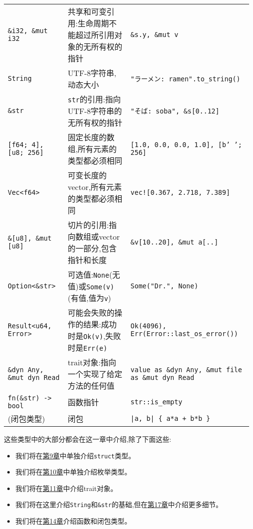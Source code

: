 \begin{longtable}{p{}p{}p{}}
    \texttt{\&i32, \&mut i32}                       & 共享和可变引用:生命周期不能超过所引用对象的无所有权的指针 & \texttt{\&s.y, \&mut v} \\
    \rowcolor{tablecolor}
    \texttt{String}                                 & UTF-8字符串,动态大小         & \texttt{"ラーメン: ramen"\newline.to\_string()} \\
    \texttt{\&str}                                  & \texttt{str}的引用:指向UTF-8字符串的无所有权的指针 & \texttt{"そば: soba", \&s[0..12]} \\
    \rowcolor{tablecolor}
    \texttt{[f64; 4], [u8; 256]}                    & 固定长度的数组,所有元素的类型都必须相同   & \texttt{[1.0, 0.0, 0.0, 1.0], [b' '; 256]} \\
    \texttt{Vec<f64>}                               & 可变长度的vector,所有元素的类型都必须相同 & \texttt{vec![0.367, 2.718, 7.389]} \\
    \rowcolor{tablecolor}
    \texttt{\&[u8], \&mut [u8]}                     & 切片的引用:指向数组或vector的一部分,包含指针和长度 & \texttt{\&v[10..20], \&mut a[..]} \\
    \texttt{Option<\&str>}      & 可选值:\texttt{None}(无值)或\texttt{Some(v)}(有值,值为\texttt{v})   & \texttt{Some("Dr.", None)} \\
    \rowcolor{tablecolor}
    \texttt{Result<u64, Error>} & 可能会失败的操作的结果:成功时是\texttt{Ok(v)},失败时是\texttt{Err(e)} & \texttt{Ok(4096), Err(Error::last\_os\_error())} \\
    \texttt{\&dyn Any, \&mut dyn Read}  & trait对象:指向一个实现了给定方法的任何值 & \texttt{value as \&dyn Any, \&mut file as \&mut dyn Read} \\
    \rowcolor{tablecolor}
    \texttt{fn(\&str) -> bool}          & 函数指针      & \texttt{str::is\_empty}           \\
    (闭包类型)                         & 闭包         & \texttt{|a, b| \{ a*a + b*b \}}    \\
\end{longtable}

这些类型中的大部分都会在这一章中介绍,除了下面这些:
\begin{itemize}
    \item 我们将在\hyperref[ch09]{第9章}中单独介绍\texttt{struct}类型。
    \item 我们将在\hyperref[ch10]{第10章}中单独介绍枚举类型。
    \item 我们将在\hyperref[ch11]{第11章}中介绍trait对象。
    \item 我们将在这里介绍\texttt{String}和\texttt{\&str}的基础,但在\hyperref[ch17]{第17章}中介绍更多细节。
    \item 我们将在\hyperref[ch14]{第14章}介绍函数和闭包类型。
\end{itemize}

